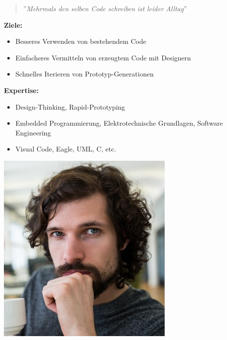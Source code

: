 \begin{tcolorbox}[title={Persona \#2, Mark, 28, Creative Technologist},toptitle=3mm,bottomtitle=3mm, bicolor ,sidebyside,righthand width=3cm, sharp corners, boxrule=.4pt, colback=green!5, colbacklower=green!5]
    \begin{quote}
        ''\textit{Mehrmals den selben Code schreiben ist leider Alltag}''
    \end{quote}
    \textbf{Ziele:} 
    \begin{itemize}
        \item Besseres Verwenden von bestehendem Code
        \item Einfacheres Vermitteln von erzeugtem Code mit Designern
        \item Schnelles Iterieren von Prototyp-Generationen
    \end{itemize}
    \textbf{Expertise:} 
    \begin{itemize}
        \item Design-Thinking, Rapid-Prototyping
        \item Embedded Programmierung, Elektrotechnische Grundlagen, Software Engineering
        \item Visual Code, Eagle, UML, C, etc.
    \end{itemize}
    \tcblower
    \includegraphics[width=\linewidth]{bilder/chapter3/mark.png}
\end{tcolorbox}

